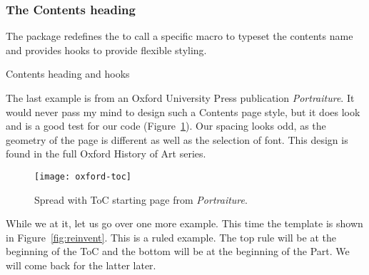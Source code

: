 \subsubsection{The Contents heading}
 
 The   package redefines the \cmd{\tableofcontents}  to call a specific macro to typeset
 the contents name and provides hooks to provide flexible styling. 
              
\begin{texexample}{Contents heading and hooks}{}
\sampletoctitle
{}
\sampletoctitle
{}
          
\sampletoctitle
\end{texexample}

The last example is from an Oxford University Press publication \textit{Portraiture}. It would never pass my mind to design such a Contents page style, but it does look and is a good test for our code  (Figure~\ref{tocsample}). Our spacing looks odd, as the geometry of the page is different as well as the selection of font. This design is found in the full Oxford History of Art series.

\begin{figure}[htbp]
\centering
\texttt{[image: oxford-toc]}
\caption{Spread with ToC starting page from \textit{Portraiture}.}
\label{tocsample}
\end{figure}

While we at it, let us go over one more example. This time the template is shown in Figure~\ref{fig:reinvent}. This is a ruled example. The top rule will be at the beginning of the ToC and the bottom will be at the beginning of the Part. We will come back for the latter later.


